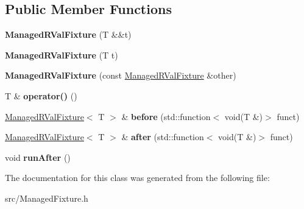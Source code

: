 \subsection*{Public Member Functions}
\begin{DoxyCompactItemize}
\item 
\hypertarget{class_managed_r_val_fixture_abfbd7fabbbffe76a54ea70282120d451}{{\bfseries Managed\-R\-Val\-Fixture} (T \&\&t)}\label{class_managed_r_val_fixture_abfbd7fabbbffe76a54ea70282120d451}

\item 
\hypertarget{class_managed_r_val_fixture_aacb6499f9c66bf37547a750a538fde5e}{{\bfseries Managed\-R\-Val\-Fixture} (T t)}\label{class_managed_r_val_fixture_aacb6499f9c66bf37547a750a538fde5e}

\item 
\hypertarget{class_managed_r_val_fixture_a0484b27d970b3730f94757e41d4acf5a}{{\bfseries Managed\-R\-Val\-Fixture} (const \hyperlink{class_managed_r_val_fixture}{Managed\-R\-Val\-Fixture} \&other)}\label{class_managed_r_val_fixture_a0484b27d970b3730f94757e41d4acf5a}

\item 
\hypertarget{class_managed_r_val_fixture_a74c672037e2be5b21acc436435a6650e}{T \& {\bfseries operator()} ()}\label{class_managed_r_val_fixture_a74c672037e2be5b21acc436435a6650e}

\item 
\hypertarget{class_managed_r_val_fixture_a34296f8d7958ce6c81188b08198d569f}{\hyperlink{class_managed_r_val_fixture}{Managed\-R\-Val\-Fixture}$<$ T $>$ \& {\bfseries before} (std\-::function$<$ void(T \&)$>$ funct)}\label{class_managed_r_val_fixture_a34296f8d7958ce6c81188b08198d569f}

\item 
\hypertarget{class_managed_r_val_fixture_acfa46102d60a7f1d0d357f8b631f0623}{\hyperlink{class_managed_r_val_fixture}{Managed\-R\-Val\-Fixture}$<$ T $>$ \& {\bfseries after} (std\-::function$<$ void(T \&)$>$ funct)}\label{class_managed_r_val_fixture_acfa46102d60a7f1d0d357f8b631f0623}

\item 
\hypertarget{class_managed_r_val_fixture_a562a4f2e7c01cfa4844efae9ec0ea588}{void {\bfseries run\-After} ()}\label{class_managed_r_val_fixture_a562a4f2e7c01cfa4844efae9ec0ea588}

\end{DoxyCompactItemize}


The documentation for this class was generated from the following file\-:\begin{DoxyCompactItemize}
\item 
src/Managed\-Fixture.\-h\end{DoxyCompactItemize}
